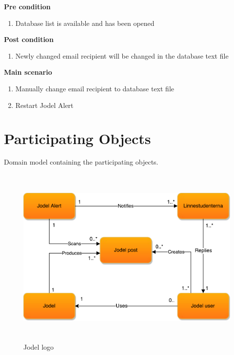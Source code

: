 \documentclass[a4paper,12pt]{article}
\begin{document}
\textbf{Pre condition}
\begin{enumerate}
	\item Database list is available and has been opened
\end{enumerate}
\textbf{Post condition}
\begin{enumerate}
	\item Newly changed email recipient will be changed in the database text file
\end{enumerate}

\textbf{Main scenario}
\begin{enumerate}
	\item Manually change email recipient to database text file
	\item Restart Jodel Alert
\end{enumerate}

\section{Participating Objects}
Domain model containing the participating objects.\\

\begin{figure}[!h]
	\centering
	\includegraphics[height=9cm]{img/ParticipatingObjects.pdf}
	\caption{Jodel logo}
	\label{Cisco routing}
\end{figure}
\end{document}

